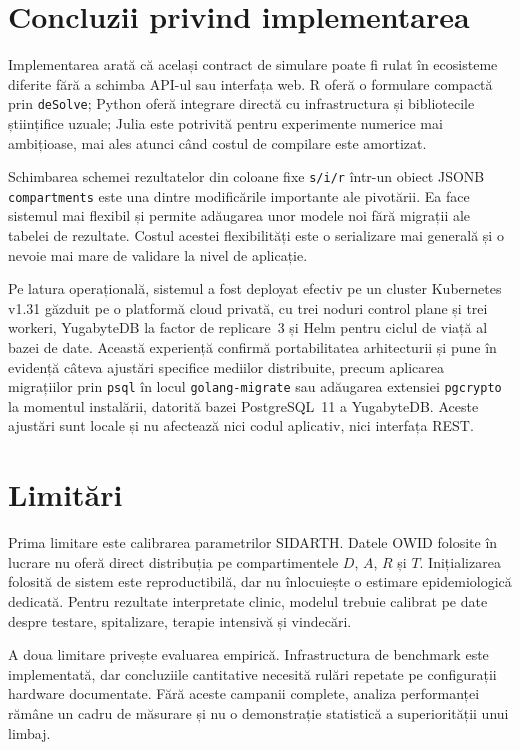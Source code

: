 \section{Concluzii privind implementarea}
\label{sec:concluzii_implementare}

Implementarea arată că același contract de simulare poate fi rulat în ecosisteme
diferite fără a schimba API-ul sau interfața web. R oferă o formulare compactă
prin \texttt{deSolve}; Python oferă integrare directă cu infrastructura și
bibliotecile științifice uzuale; Julia este potrivită pentru experimente numerice
mai ambițioase, mai ales atunci când costul de compilare este amortizat.

Schimbarea schemei rezultatelor din coloane fixe \texttt{s/i/r} într-un obiect
JSONB \texttt{compartments} este una dintre modificările importante ale pivotării.
Ea face sistemul mai flexibil și permite adăugarea unor modele noi fără migrații
ale tabelei de rezultate. Costul acestei flexibilități este o serializare mai
generală și o nevoie mai mare de validare la nivel de aplicație.

Pe latura operațională, sistemul a fost deployat efectiv pe un cluster Kubernetes
v1.31 găzduit pe o platformă cloud privată, cu trei noduri control plane și trei
workeri, YugabyteDB la factor de replicare~3 și Helm pentru ciclul de viață al
bazei de date. Această experiență confirmă portabilitatea arhitecturii și pune
în evidență câteva ajustări specifice mediilor distribuite, precum aplicarea
migrațiilor prin \texttt{psql} în locul \texttt{golang-migrate} sau adăugarea
extensiei \texttt{pgcrypto} la momentul instalării, datorită bazei PostgreSQL~11
a YugabyteDB. Aceste ajustări sunt locale și nu afectează nici codul aplicativ,
nici interfața REST.

\section{Limitări}
\label{sec:limitari}

Prima limitare este calibrarea parametrilor SIDARTH. Datele OWID folosite în
lucrare nu oferă direct distribuția pe compartimentele $D$, $A$, $R$ și $T$.
Inițializarea folosită de sistem este reproductibilă, dar nu înlocuiește o
estimare epidemiologică dedicată. Pentru rezultate interpretate clinic, modelul
trebuie calibrat pe date despre testare, spitalizare, terapie intensivă și
vindecări.

A doua limitare privește evaluarea empirică. Infrastructura de benchmark este
implementată, dar concluziile cantitative necesită rulări repetate pe configurații
hardware documentate. Fără aceste campanii complete, analiza performanței rămâne un
cadru de măsurare și nu o demonstrație statistică a superiorității unui limbaj.

